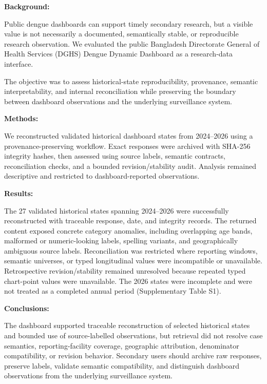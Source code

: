 \noindent\textbf{Background:}

Public dengue dashboards can support timely secondary research, but a visible value is not necessarily a documented, semantically stable, or reproducible research observation. We evaluated the public Bangladesh Directorate General of Health Services (DGHS) Dengue Dynamic Dashboard as a research-data interface.

The objective was to assess historical-state reproducibility, provenance, semantic interpretability, and internal reconciliation while preserving the boundary between dashboard observations and the underlying surveillance system.

\medskip\noindent\textbf{Methods:}

We reconstructed validated historical dashboard states from 2024--2026 using a provenance-preserving workflow. Exact responses were archived with SHA-256 integrity hashes, then assessed using source labels, semantic contracts, reconciliation checks, and a bounded revision/stability audit. Analysis remained descriptive and restricted to dashboard-reported observations.

\medskip\noindent\textbf{Results:}

The 27 validated historical states spanning 2024--2026 were successfully reconstructed with traceable response, date, and integrity records. The returned content exposed concrete category anomalies, including overlapping age bands, malformed or numeric-looking labels, spelling variants, and geographically ambiguous source labels. Reconciliation was restricted where reporting windows, semantic universes, or typed longitudinal values were incompatible or unavailable. Retrospective revision/stability remained unresolved because repeated typed chart-point values were unavailable. The 2026 states were incomplete and were not treated as a completed annual period (Supplementary Table S1).

\medskip\noindent\textbf{Conclusions:}

The dashboard supported traceable reconstruction of selected historical states and bounded use of source-labelled observations, but retrieval did not resolve case semantics, reporting-facility coverage, geographic attribution, denominator compatibility, or revision behavior. Secondary users should archive raw responses, preserve labels, validate semantic compatibility, and distinguish dashboard observations from the underlying surveillance system.
